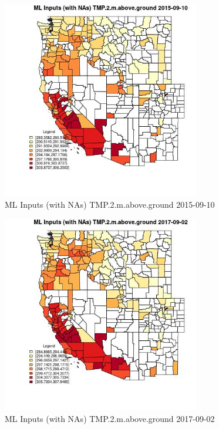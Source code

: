 \begin{figure} 
\centering  
\includegraphics[width=0.77\textwidth]{Code_Outputs/Report_ML_input_PM25_Step4_part_e_de_duplicated_aves_compiled_2019-05-21wNAs_CountyTMP2mabovegroundMean2015-09-10.jpg} 
\caption{\label{fig:Report_ML_input_PM25_Step4_part_e_de_duplicated_aves_compiled_2019-05-21wNAsCountyTMP2mabovegroundMean2015-09-10}ML Inputs (with NAs) TMP.2.m.above.ground 2015-09-10} 
\end{figure} 
 

\begin{figure} 
\centering  
\includegraphics[width=0.77\textwidth]{Code_Outputs/Report_ML_input_PM25_Step4_part_e_de_duplicated_aves_compiled_2019-05-21wNAs_CountyTMP2mabovegroundMean2017-09-02.jpg} 
\caption{\label{fig:Report_ML_input_PM25_Step4_part_e_de_duplicated_aves_compiled_2019-05-21wNAsCountyTMP2mabovegroundMean2017-09-02}ML Inputs (with NAs) TMP.2.m.above.ground 2017-09-02} 
\end{figure} 
 

